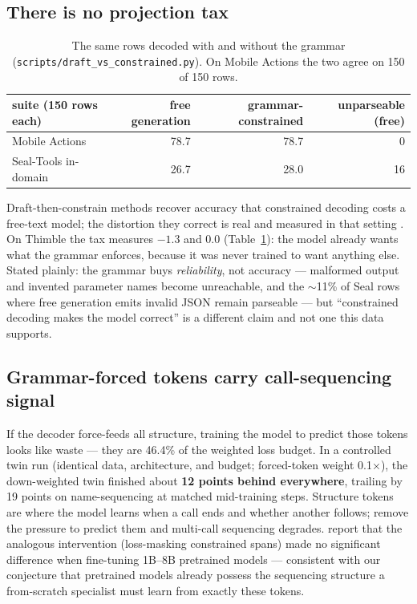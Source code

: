 \documentclass[10pt]{article}
\newcommand{\thimble}{Thimble}
\begin{document}
\subsection{There is no projection tax}
\label{sec:notax}

\begin{table}[h]
\centering
\small
\begin{tabular}{lrrr}
\toprule
suite (150 rows each) & free generation & grammar-constrained & unparseable (free)\\
\midrule
Mobile Actions & 78.7 & 78.7 & 0\\
Seal-Tools in-domain & 26.7 & 28.0 & 16\\
\bottomrule
\end{tabular}
\caption{The same rows decoded with and without the grammar
(\texttt{scripts/draft\_vs\_constrained.py}). On Mobile Actions the two agree
on 150 of 150 rows.}
\label{tab:notax}
\end{table}

Draft-then-constrain methods \citep{dccd} recover accuracy that constrained
decoding costs a free-text model; the distortion they correct is real and
measured in that setting \citep{gad}. On \thimble{} the tax measures $-1.3$
and $0.0$ (Table~\ref{tab:notax}): the model already wants what the grammar
enforces, because it was never trained to want anything else. Stated plainly:
the grammar buys \emph{reliability}, not accuracy --- malformed output and
invented parameter names become unreachable, and the $\sim$11\% of Seal rows
where free generation emits invalid JSON remain parseable --- but
``constrained decoding makes the model correct'' is a different claim and not
one this data supports.

\subsection{Grammar-forced tokens carry call-sequencing signal}
\label{sec:rft}

If the decoder force-feeds all structure, training the model to predict those
tokens looks like waste --- they are 46.4\% of the weighted loss budget. In a
controlled twin run (identical data, architecture, and budget; forced-token
weight 0.1$\times$), the down-weighted twin finished about \textbf{12 points
behind everywhere}, trailing by 19 points on name-sequencing at matched
mid-training steps. Structure tokens are where the model learns when a call
ends and whether another follows; remove the pressure to predict them and
multi-call sequencing degrades. \citet{gan2025} report that the analogous
intervention (loss-masking constrained spans) made no significant difference
when fine-tuning 1B--8B pretrained models --- consistent with our conjecture
that pretrained models already possess the sequencing structure a from-scratch
specialist must learn from exactly these tokens.
\end{document}
